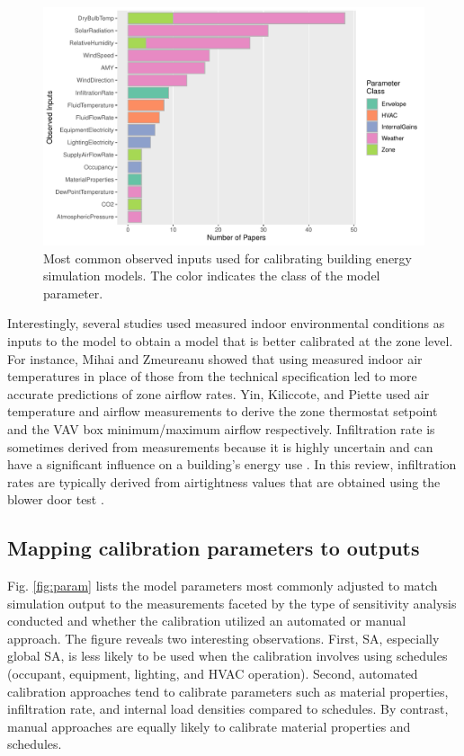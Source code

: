 \documentclass[review]{elsarticle}
\begin{document}
\begin{figure}[!h]
\centering
\includegraphics[width=\textwidth]{figures/obs_input_rank.pdf}
\caption{Most common observed inputs used for calibrating building energy simulation models. The color indicates the class of the model parameter.}
\label{fig:input}
\end{figure}

Interestingly, several studies used measured indoor environmental conditions as inputs to the model to obtain a model that is better calibrated at the zone level. For instance, Mihai and Zmeureanu \cite{mihai2017bottom} showed that using measured indoor air temperatures in place of those from the technical specification led to more accurate predictions of zone airflow rates. Yin, Kiliccote, and Piette \cite{yin2016linking} used air temperature and airflow measurements to derive the zone thermostat setpoint and the VAV box minimum/maximum airflow respectively. Infiltration rate is sometimes derived from measurements because it is highly uncertain and can have a significant influence on a building's energy use \cite{persily2010modeled}. In this review, infiltration rates are typically derived from airtightness values that are obtained using the blower door test \cite{kim2018model, bandera2017towards, vesterberg2016calibration, ramosruiz2016genetic, roberti2015calibrating, zuhaib2019application, fernandez2020novel, escandon2017assessment}.

\subsection{Mapping calibration parameters to outputs} \label{sec:output_param}

Fig. \ref{fig:param}  lists the model parameters most commonly adjusted to match simulation output to the measurements faceted by the type of sensitivity analysis conducted and whether the calibration utilized an automated or manual approach. The figure reveals two interesting observations. First, SA, especially global SA, is less likely to be used when the calibration involves using schedules (occupant, equipment, lighting, and HVAC operation). Second, automated calibration approaches tend to calibrate parameters such as material properties, infiltration rate, and internal load densities compared to schedules. By contrast, manual approaches are equally likely to calibrate material properties and schedules. 
\end{document}
